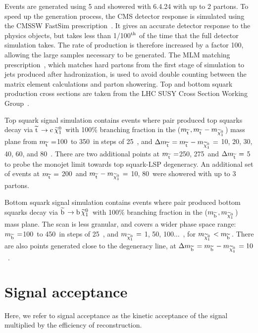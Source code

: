 Events are generated using \MADGRAPH{}5 and showered with \PYTHIA{}6.4.24 with up to 2 partons. To speed up the generation process, the CMS detector response is simulated using the CMSSW FastSim prescription~\cite{FASTSIM}. 
It gives an accurate detector response to the physics objects, but takes less than 1/100$^{\rm th}$ of the time that the full \GEANTfour detector simulation takes. 
The rate of production is therefore increased by a factor 100, allowing the large samples necessary to be generated.
The MLM matching prescription~\cite{MLMmatching}, which matches hard partons from the first stage of simulation to jets produced after hadronization, is used to avoid double counting between the matrix element calculations and parton showering.
Top and bottom squark production cross sections are taken from the LHC SUSY Cross Section Working Group~\cite{bib:SUSYxs}.

Top squark signal simulation 
contains events where pair produced top squarks decay via $\widetilde{{\rm t}}\,\rightarrow{\rm c}\,\widetilde{\chi}^{0}_{1}\,$ with 100\% branching fraction
in the ($m_{\widetilde{{\rm t}}\,}, m_{\widetilde{{\rm t}}\,} - m_{\widetilde{\chi}^{0}_{1}\,}$) mass plane from $m_{\widetilde{{\rm t}}\,} =$100~\GeV to 350~\GeV in steps of 25~\GeV, and 
$\Delta m_{\widetilde{{\rm t}}\,} = m_{\widetilde{{\rm t}}\,} - m_{\widetilde{\chi}^{0}_{1}\,} = $ 10, 20, 30, 40, 60, and 80~\GeV. 
There are two additional points at  $m_{\widetilde{{\rm t}}\,} =$250, 275~\GeV and $\Delta m_{\widetilde{{\rm t}}\,} = $ 5 to probe the monojet limit towards top squark-LSP degeneracy.
An additional set of events at $m_{\widetilde{{\rm t}}\,} =$ 200~\GeV and $m_{\widetilde{{\rm t}}\,} - m_{\widetilde{\chi}^{0}_{1}\,} =$ 10, 80~\GeV were showered with up to 3 partons.



Bottom squark signal simulation 
contains events where pair produced bottom squarks decay via $\widetilde{{\rm b}}\,\rightarrow{\rm b}\,\widetilde{\chi}^{0}_{1}\,$ with 100\% branching fraction
in the ($m_{\widetilde{{\rm b}}\,}, m_{\widetilde{\chi}^{0}_{1}\,}$) mass plane.
The scan is less granular, and covers a wider phase space range: 
$m_{\widetilde{{\rm b}}\,} =$100~\GeV to 450~\GeV in steps of 25~\GeV, and 
$m_{\widetilde{\chi}^{0}_{1}\,} = $ 1, 50, 100...~\GeV, for $m_{\widetilde{\chi}^{0}_{1}\,} < m_{\widetilde{{\rm b}}\,}$.
There are also points generated close to the degeneracy line, at 
$\Delta m_{\widetilde{{\rm b}}\,} = m_{\widetilde{{\rm b}}\,} - m_{\widetilde{\chi}^{0}_{1}\,} = 10$~\GeV.


\section{Signal acceptance}

Here, we refer to signal acceptance as the kinetic acceptance of the signal multiplied by the efficiency of reconstruction. 

